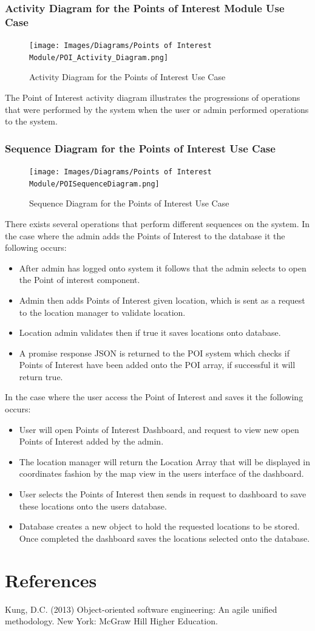 \documentclass[runningheads,a4paper]{article}
\begin{document}
\subsubsection {Activity Diagram for the Points of Interest Module Use Case}
 	\begin{figure}[H]
   	\centering
   	\texttt{[image: Images/Diagrams/Points of Interest Module/POI\_Activity\_Diagram.png]}
   	\caption{Activity Diagram for the Points of Interest Use Case}
	\end{figure}
	
	The Point of Interest activity diagram illustrates the progressions of operations that were performed by the system when the user or admin performed operations to the system. 
	 
\subsubsection {Sequence Diagram for the Points of Interest Use Case}
 	\begin{figure}[H]
   	\centering
   	\texttt{[image: Images/Diagrams/Points of Interest Module/POISequenceDiagram.png]}
   	\caption{Sequence Diagram for the Points of Interest Use Case}
	\end{figure}
	There exists several operations that perform different sequences on the system.
	In the case where the admin adds the Points of Interest to the database it the following occurs:
	\begin{itemize}
		\item  After admin has logged onto system it follows that the admin selects to open the Point of interest component.
		\item Admin then adds Points of Interest given location, which is sent as a request to the location manager to validate location. 
		\item Location admin validates then if true it saves locations onto database.
		\item A promise response JSON is returned to the POI system which checks if Points of Interest have been added onto the POI array, if successful it will return true.
	\end{itemize}
	
	In the case where the user access the Point of Interest and saves it the following occurs:
	\begin{itemize}
		\item  User will open Points of Interest Dashboard, and request to view new open Points of Interest added by the admin. 
		\item The location manager will return the Location Array that will be displayed in coordinates fashion by the map view in the users interface of the dashboard.  
		\item User selects the Points of Interest then sends in request to dashboard to save these locations onto the users database.
		\item Database creates a new object to hold the requested locations to be stored. Once completed the dashboard saves the locations selected onto the database.
	\end{itemize}
	


\section{References}

Kung, D.C. (2013) Object-oriented software engineering: An agile unified methodology. New York: McGraw Hill Higher Education.
\end{document}
